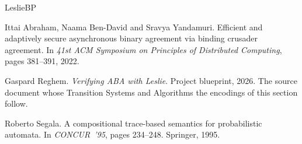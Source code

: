 \begin{thebibliography}{LeslieBP}

Ittai Abraham, Naama Ben-David and Sravya Yandamuri.
Efficient and adaptively secure asynchronous binary agreement via binding crusader agreement.
In \emph{41st ACM Symposium on Principles of Distributed Computing}, pages 381--391, 2022.

Gaspard Reghem.
\emph{Verifying ABA with Leslie}.
Project blueprint, 2026.
The source document whose Transition Systems and Algorithms the encodings of this section follow.

Roberto Segala.
A compositional trace-based semantics for probabilistic automata.
In \emph{CONCUR~'95}, pages 234--248. Springer, 1995.

\end{thebibliography}
